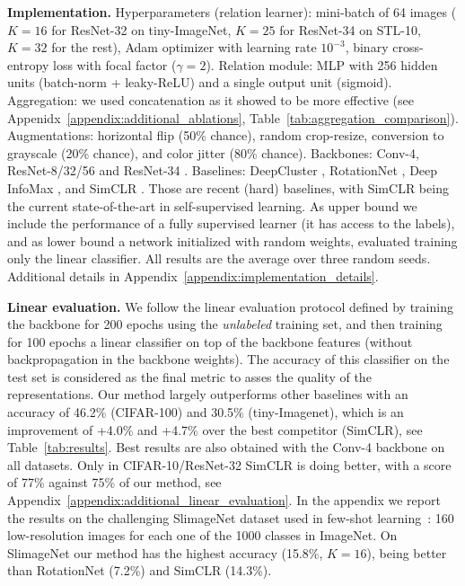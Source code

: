 \documentclass{article}
\begin{document}
\textbf{Implementation.} Hyperparameters (relation learner): mini-batch of 64 images ($K=16$ for ResNet-32 on tiny-ImageNet, $K=25$ for ResNet-34 on STL-10, $K=32$ for the rest), Adam optimizer with learning rate $10^{-3}$, binary cross-entropy loss with focal factor ($\gamma=2$). Relation module: MLP with 256 hidden units (batch-norm + leaky-ReLU) and a single output unit (sigmoid). Aggregation: we used concatenation as it showed to be more effective (see Appenidx~\ref{appendix:additional_ablations}, Table~\ref{tab:aggregation_comparison}). Augmentations: horizontal flip (50\% chance), random crop-resize, conversion to grayscale (20\% chance), and color jitter (80\% chance). Backbones: Conv-4, ResNet-8/32/56 and ResNet-34 \citep{he2016deep}.
Baselines: DeepCluster \citep{caron2018deep}, RotationNet \citep{gidaris2018unsupervised}, Deep InfoMax \citep{hjelm2018learning}, and SimCLR \citep{chen2020simple}. Those are recent (hard) baselines, with SimCLR being the current state-of-the-art in self-supervised learning. As upper bound we include the performance of a fully supervised learner (it has access to the labels), and as lower bound a network initialized with random weights, evaluated training only the linear classifier.
All results are the average over three random seeds. Additional details in Appendix~\ref{appendix:implementation_details}.

\textbf{Linear evaluation.} We follow the linear evaluation protocol defined by \cite{kolesnikov2019revisiting} training the backbone for 200 epochs using the \emph{unlabeled} training set, and then training for 100 epochs a linear classifier on top of the backbone features (without backpropagation in the backbone weights). The accuracy of this classifier on the test set is considered as the final metric to asses the quality of the representations. Our method largely outperforms other baselines with an accuracy of 46.2\% (CIFAR-100) and 30.5\% (tiny-Imagenet), which is an improvement of +4.0\% and +4.7\% over the best competitor (SimCLR), see Table~\ref{tab:results}. Best results are also obtained with the Conv-4 backbone on all datasets. Only in CIFAR-10/ResNet-32 SimCLR is doing better, with a score of 77\% against 75\% of our method, see  Appendix~\ref{appendix:additional_linear_evaluation}. In the appendix we report the results on the challenging SlimageNet dataset used in few-shot learning~\citep{antoniou2020defining}: 160 low-resolution images for each one of the 1000 classes in ImageNet. On SlimageNet our method has the highest accuracy (15.8\%, $K=16$), being better than RotationNet (7.2\%) and SimCLR (14.3\%).
\end{document}
